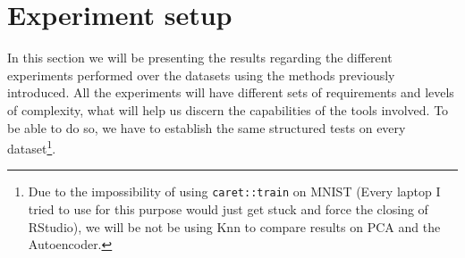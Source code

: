 
\section{Experiment setup}
In this section we will be presenting the results regarding the different experiments performed over the datasets using the methods previously introduced. All the experiments will have different sets of requirements and levels of complexity, what will help us discern the capabilities of the tools involved. To be able to do so, we have to establish the same structured tests on every dataset\footnote{Due to the impossibility of using \texttt{caret::train} on MNIST (Every laptop I tried to use for this purpose would just get stuck and force the closing of RStudio), we will be not be using Knn to compare results on PCA and the Autoencoder. }.

